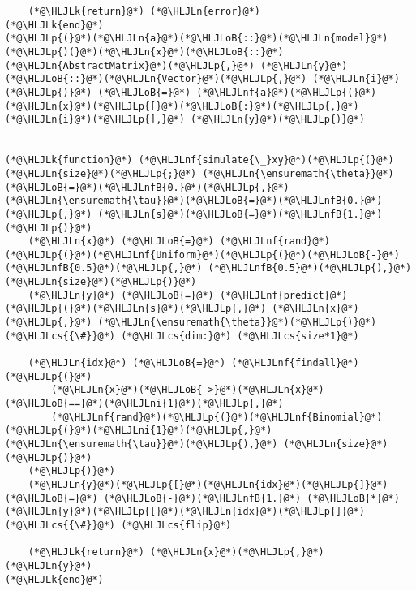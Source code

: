 \documentclass[12pt,a4paper]{article}
\newcommand{\HLJLk}[1]{\textcolor[RGB]{148,91,176}{\textbf{#1}}}
\newcommand{\HLJLn}[1]{#1}
\newcommand{\HLJLnf}[1]{\textcolor[RGB]{66,102,213}{#1}}
\newcommand{\HLJLnfB}[1]{\textcolor[RGB]{59,151,46}{#1}}
\newcommand{\HLJLni}[1]{\textcolor[RGB]{59,151,46}{#1}}
\newcommand{\HLJLoB}[1]{\textcolor[RGB]{102,102,102}{\textbf{#1}}}
\newcommand{\HLJLp}[1]{#1}
\newcommand{\HLJLcs}[1]{\textcolor[RGB]{153,153,119}{\textit{#1}}}
\begin{document}
\begin{lstlisting}
    (*@\HLJLk{return}@*) (*@\HLJLn{error}@*)
(*@\HLJLk{end}@*)
(*@\HLJLp{(}@*)(*@\HLJLn{a}@*)(*@\HLJLoB{::}@*)(*@\HLJLn{model}@*)(*@\HLJLp{)(}@*)(*@\HLJLn{x}@*)(*@\HLJLoB{::}@*)(*@\HLJLn{AbstractMatrix}@*)(*@\HLJLp{,}@*) (*@\HLJLn{y}@*)(*@\HLJLoB{::}@*)(*@\HLJLn{Vector}@*)(*@\HLJLp{,}@*) (*@\HLJLn{i}@*)(*@\HLJLp{)}@*) (*@\HLJLoB{=}@*) (*@\HLJLnf{a}@*)(*@\HLJLp{(}@*)(*@\HLJLn{x}@*)(*@\HLJLp{[}@*)(*@\HLJLoB{:}@*)(*@\HLJLp{,}@*) (*@\HLJLn{i}@*)(*@\HLJLp{],}@*) (*@\HLJLn{y}@*)(*@\HLJLp{)}@*)


(*@\HLJLk{function}@*) (*@\HLJLnf{simulate{\_}xy}@*)(*@\HLJLp{(}@*)(*@\HLJLn{size}@*)(*@\HLJLp{;}@*) (*@\HLJLn{\ensuremath{\theta}}@*)(*@\HLJLoB{=}@*)(*@\HLJLnfB{0.}@*)(*@\HLJLp{,}@*) (*@\HLJLn{\ensuremath{\tau}}@*)(*@\HLJLoB{=}@*)(*@\HLJLnfB{0.}@*)(*@\HLJLp{,}@*) (*@\HLJLn{s}@*)(*@\HLJLoB{=}@*)(*@\HLJLnfB{1.}@*)(*@\HLJLp{)}@*)
    (*@\HLJLn{x}@*) (*@\HLJLoB{=}@*) (*@\HLJLnf{rand}@*)(*@\HLJLp{(}@*)(*@\HLJLnf{Uniform}@*)(*@\HLJLp{(}@*)(*@\HLJLoB{-}@*)(*@\HLJLnfB{0.5}@*)(*@\HLJLp{,}@*) (*@\HLJLnfB{0.5}@*)(*@\HLJLp{),}@*) (*@\HLJLn{size}@*)(*@\HLJLp{)}@*)
    (*@\HLJLn{y}@*) (*@\HLJLoB{=}@*) (*@\HLJLnf{predict}@*)(*@\HLJLp{(}@*)(*@\HLJLn{s}@*)(*@\HLJLp{,}@*) (*@\HLJLn{x}@*)(*@\HLJLp{,}@*) (*@\HLJLn{\ensuremath{\theta}}@*)(*@\HLJLp{)}@*)  (*@\HLJLcs{{\#}}@*) (*@\HLJLcs{dim:}@*) (*@\HLJLcs{size*1}@*)
    
    (*@\HLJLn{idx}@*) (*@\HLJLoB{=}@*) (*@\HLJLnf{findall}@*)(*@\HLJLp{(}@*)
        (*@\HLJLn{x}@*)(*@\HLJLoB{->}@*)(*@\HLJLn{x}@*)(*@\HLJLoB{==}@*)(*@\HLJLni{1}@*)(*@\HLJLp{,}@*) 
        (*@\HLJLnf{rand}@*)(*@\HLJLp{(}@*)(*@\HLJLnf{Binomial}@*)(*@\HLJLp{(}@*)(*@\HLJLni{1}@*)(*@\HLJLp{,}@*) (*@\HLJLn{\ensuremath{\tau}}@*)(*@\HLJLp{),}@*) (*@\HLJLn{size}@*)(*@\HLJLp{)}@*)
    (*@\HLJLp{)}@*)
    (*@\HLJLn{y}@*)(*@\HLJLp{[}@*)(*@\HLJLn{idx}@*)(*@\HLJLp{]}@*) (*@\HLJLoB{=}@*) (*@\HLJLoB{-}@*)(*@\HLJLnfB{1.}@*) (*@\HLJLoB{*}@*) (*@\HLJLn{y}@*)(*@\HLJLp{[}@*)(*@\HLJLn{idx}@*)(*@\HLJLp{]}@*)  (*@\HLJLcs{{\#}}@*) (*@\HLJLcs{flip}@*)
    
    (*@\HLJLk{return}@*) (*@\HLJLn{x}@*)(*@\HLJLp{,}@*) (*@\HLJLn{y}@*)
(*@\HLJLk{end}@*)
\end{lstlisting}
\end{document}
